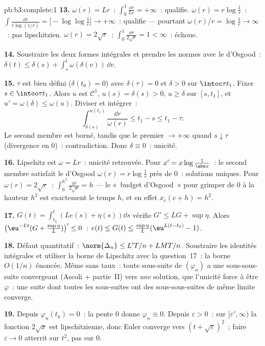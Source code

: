 \begin{solution}{pb:b3:complete:1}
\textbf{13.} $\omega(r) = Lr$~: $\int_0^1\frac{\dd r}{Lr} =
+\infty$~: qualifie. $\omega(r) = r\log\frac1r$~:
$\int\frac{\dd r}{r\log(1/r)} = \bigl[-\log\log\frac1r\bigr]
\to +\infty$~: qualifie --- pourtant $\omega(r)/r =
\log\frac1r \to \infty$~: pas lipschitzien. $\omega(r) =
2\sqrt r$~: $\int_0^1\frac{\dd r}{2\sqrt r} = 1 < \infty$~:
échoue.

\textbf{14.} Soustraire les deux formes intégrales et prendre
les normes avec le  d'Osgood~: $\delta(t) \leq
\delta(s) + \int_s^t\omega(\delta(v))\,\dd v$.

\textbf{15.} $\tau$ est bien défini ($\delta(t_0) = 0$) avec
$\delta(\tau) = 0$ et $\delta > 0$ sur $\intoc\tau{t_1}$.
Fixer $s \in \intoo\tau{t_1}$. Alors $u$ est $\mathcal C^1$,
$u(s) = \delta(s) > 0$, $u \geq \delta$ sur $[s, t_1]$, et
$u' = \omega(\delta) \leq \omega(u)$. Diviser et intégrer~:
\[
\int_{\delta(s)}^{u(t_1)}\frac{\dd r}{\omega(r)}
\leq t_1 - s \leq t_1 - \tau .
\]
Le second membre est borné, tandis que le premier $\to
+\infty$ quand $s \downarrow \tau$ (divergence en $0$)~:
contradiction. Donc $\delta \equiv 0$~: unicité.

\textbf{16.} Lipschitz est $\omega = Lr$~: unicité
retrouvée. Pour $x' = x\log\frac1{\abs x}$~: le second membre
satisfait le  d'Osgood $\omega(r) = r\log\frac1r$ près
de $0$~: solutions uniques. Pour $\omega(r) = 2\sqrt r$~:
$\int_0^{h^2}\frac{\dd r}{2\sqrt r} = h$ --- le «~budget
d'Osgood~» pour grimper de $0$ à la hauteur $h^2$ est
exactement le temps $h$, et en effet $x_c(c + h) = h^2$.

\textbf{17.} $G(t) = \int_{t_0}^t(Le(s) + \eta(s))\dd s$
vérifie $G' \leq LG + \sup\eta$. Alors
$\bigl(\eu^{-Lt}(G + \tfrac{\sup\eta}L)\bigr)' \leq 0$~: $e(t)
\leq G(t) \leq \frac{\sup\eta}L(\eu^{L(t-t_0)} - 1)$.

\textbf{18.} Défaut quantitatif~: $\norm{\Delta_n} \leq L'T/n
+ LMT/n$. Soustraire les identités intégrales et utiliser la
borne de Lipschitz avec la question~17~: la borne $O(1/n)$
énoncée. Même sans taux~: toute sous-suite de
$(\varphi_n)$ a une sous-sous-suite convergeant (Ascoli +
partie~II) vers \emph{une} solution, que l'unicité force à
être $\varphi$~: une suite dont toutes les sous-suites ont
des sous-sous-suites de même limite converge.

\textbf{19.} Depuis $\varphi_n(t_k) = 0$~: la pente $0$ donne
$\varphi_n \equiv 0$. Depuis $\varepsilon > 0$~: sur
$[\varepsilon', \infty)$ la fonction $2\sqrt x$ est
lipschitzienne, donc Euler converge vers $(t +
\sqrt\varepsilon)^2$~; faire $\varepsilon \to 0$ atterrit sur
$t^2$, pas sur $0$.


\end{solution}
